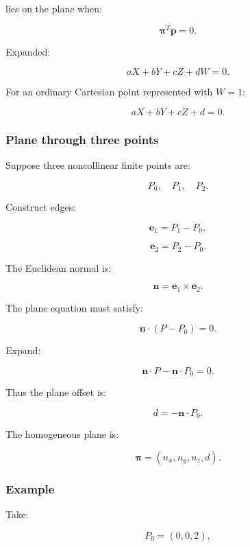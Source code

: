 lies on the plane when:

\[
 \boxed{ \boldsymbol\pi^T\mathbf p=0 }.
\]

Expanded:

\[
 \boxed{ aX+bY+cZ+dW=0 }.
\]

For an ordinary Cartesian point represented with \(W=1\):

\[
 aX+bY+cZ+d=0.
\]

\subsubsection{Plane through three points}\label{02-foundations-ii-ch032-plane-through-three-points}

\hypertarget{02-foundations-ii-ch032-plane-through-three-points}{}

Suppose three noncollinear finite points are:

\[
 P_0,\quad P_1,\quad P_2.
\]

Construct edges:

\[
 \mathbf e_1=P_1-P_0,
\]

\[
 \mathbf e_2=P_2-P_0.
\]

The Euclidean normal is:

\[
 \boxed{ \mathbf n=\mathbf e_1\times\mathbf e_2 }.
\]

The plane equation must satisfy:

\[
 \mathbf n\cdot(P-P_0)=0.
\]

Expand:

\[
 \mathbf n\cdot P-\mathbf n\cdot P_0=0.
\]

Thus the plane offset is:

\[
 \boxed{ d=-\mathbf n\cdot P_0 }.
\]

The homogeneous plane is:

\[
 \boxed{ \boldsymbol\pi= (n_x,n_y,n_z,d) }.
\]

\begin{allmightroleexample}

\subsubsection{Example}\label{02-foundations-ii-ch032-example}

\hypertarget{02-foundations-ii-ch032-example}{}

Take:

\end{allmightroleexample}

\[
 P_0=(0,0,2),
\]

